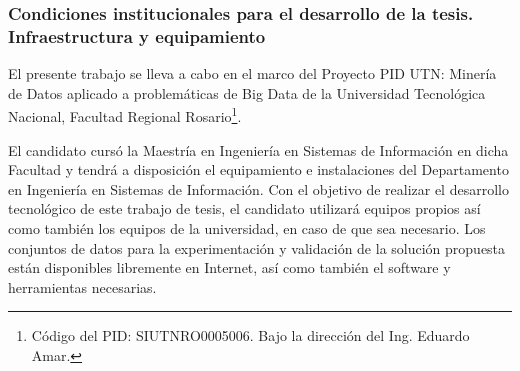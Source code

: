 \subsubsection{Condiciones institucionales para el desarrollo de la tesis. Infraestructura y equipamiento}
El presente trabajo se lleva a cabo en el marco del Proyecto PID UTN: Minería de Datos aplicado a problemáticas de Big Data de la Universidad Tecnológica Nacional, Facultad Regional Rosario\footnote{Código del PID: SIUTNRO0005006. Bajo la dirección del Ing. Eduardo Amar.}.

\bigskip El candidato cursó la Maestría en Ingeniería en Sistemas de Información en dicha Facultad y tendrá a disposición el equipamiento e instalaciones del Departamento en Ingeniería en Sistemas de Información. Con el objetivo de realizar el desarrollo tecnológico de este trabajo de tesis, el candidato utilizará equipos propios así como también los equipos de la universidad, en caso de que sea necesario. Los conjuntos de datos para la experimentación y validación de la solución propuesta están disponibles libremente en Internet, así como también el software y herramientas necesarias.

















